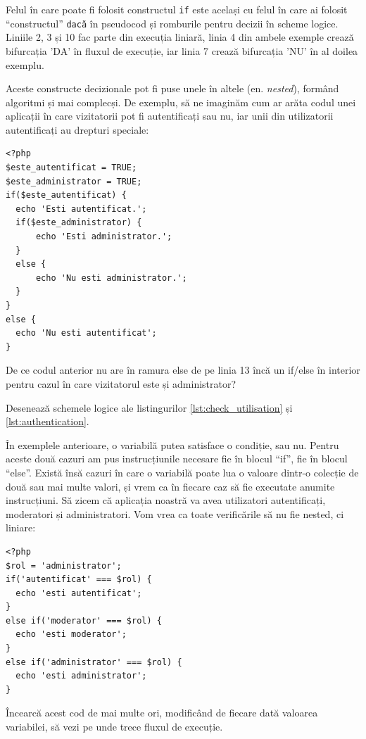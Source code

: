 Felul în care poate fi folosit constructul \texttt{if} este același cu felul în
care ai folosit ``constructul'' \texttt{dacă} în pseudocod și romburile pentru
decizii în scheme logice. Liniile 2, 3 și 10 fac parte din execuția liniară,
linia 4 din ambele exemple crează bifurcația 'DA' în fluxul de execuție,
iar linia 7 crează bifurcația 'NU' în al doilea exemplu.


Aceste constructe decizionale pot fi puse unele în altele (en. \textsl{nested}),
formând algoritmi și mai complecși. De exemplu, să ne imaginăm cum
ar arăta codul unei aplicații în care vizitatorii pot fi autentificați
sau nu, iar unii din utilizatorii autentificați au drepturi speciale:
\begin{lstlisting}[caption={Autentificare}, label=lst:authentication]
<?php
$este_autentificat = TRUE;
$este_administrator = TRUE;
if($este_autentificat) {
  echo 'Esti autentificat.';
  if($este_administrator) {
	  echo 'Esti administrator.';
  }
  else {
	  echo 'Nu esti administrator.';
  }
}
else {
  echo 'Nu esti autentificat';
}
\end{lstlisting}

\begin{Exercise}[title={Întrebare de inteligență},difficulty=1]
De ce codul anterior nu are în ramura else de pe linia 13 încă
un if/else în interior pentru cazul în care vizitatorul este
și administrator?
\end{Exercise}


\begin{Exercise}[title={Schemă logică pornind de la cod PHP},difficulty=1]
Desenează schemele logice ale listingurilor 
\ref{lst:check_utilisation} și \ref{lst:authentication}.
\end{Exercise}

În exemplele anterioare, o variabilă putea satisface o condiție, sau nu.
Pentru aceste două cazuri am pus instrucțiunile necesare fie în blocul
``if'', fie în blocul ``else''.
Există însă cazuri în care o variabilă poate lua o valoare dintr-o colecție de
două sau mai multe valori, și vrem ca în fiecare caz să fie
executate anumite instrucțiuni. Să zicem că aplicația noastră
va avea utilizatori autentificați, moderatori și administratori.
Vom vrea ca toate verificările să nu fie nested, ci liniare:
\begin{lstlisting}
<?php
$rol = 'administrator';
if('autentificat' === $rol) {
  echo 'esti autentificat';
}
else if('moderator' === $rol) {
  echo 'esti moderator';
}
else if('administrator' === $rol) {
  echo 'esti administrator';
}
\end{lstlisting}
Încearcă acest cod de mai multe ori, modificând de fiecare dată valoarea
variabilei, să vezi pe unde trece fluxul de execuție.

